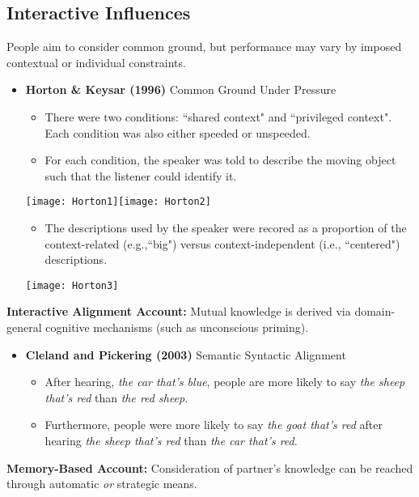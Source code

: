 \documentclass{article}
\begin{document}
\begin{multicols}{2}
\subsection{Interactive Influences}
People aim to consider common ground, but performance may vary by imposed contextual or individual constraints.
\begin{itemize}
	\item \textbf{Horton \& Keysar (1996)} Common Ground Under Pressure
	\begin{itemize}
		\item There were two conditions: \textquotedblleft shared context" and \textquotedblleft privileged context". Each condition was also either speeded or unspeeded.
		\item For each condition, the speaker was told to describe the moving object such that the listener could identify it.\\	
	\end{itemize}
	\hspace{4mm}\texttt{[image: Horton1]}\texttt{[image: Horton2]}
	\begin{itemize}
		\item The descriptions used by the speaker were recored as a proportion of the context-related (e.g.,\textquotedblleft big") versus context-independent (i.e., \textquotedblleft centered") descriptions.
	\end{itemize}
	\hspace{12mm}\texttt{[image: Horton3]}
\end{itemize}
\textbf{Interactive Alignment Account:} Mutual knowledge is derived via domain-general cognitive mechanisms (such as unconscious priming).
\begin{itemize}
	\item \textbf{Cleland and Pickering (2003)} Semantic Syntactic Alignment
	\begin{itemize}
		\item After hearing, \textit{the car that's blue}, people are more likely to say \textit{the sheep that's red} than \textit{the red sheep}.
		\item Furthermore, people were more likely to say \textit{the goat that's red} after hearing \textit{the sheep that's red} than \textit{the car that's red}.
	\end{itemize}
\end{itemize}
\textbf{Memory-Based Account:} Consideration of partner's knowledge can be reached through automatic \textit{or} strategic means.

\end{multicols}
\end{document}
